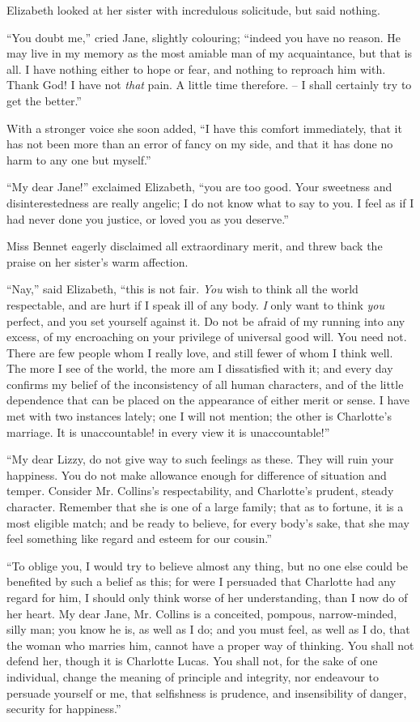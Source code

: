 Elizabeth looked at her sister with incredulous solicitude,
but said nothing.

“You doubt me,” cried Jane, slightly colouring;
“indeed you have no reason. He may live in my memory
as the most amiable man of my acquaintance, but that
is all. I have nothing either to hope or fear, and nothing
to reproach him with. Thank God! I have not \textit{that}
pain. A little time therefore. -- I shall certainly try to
get the better.”

With a stronger voice she soon added, “I have this
comfort immediately, that it has not been more than an
error of fancy on my side, and that it has done no harm
to any one but myself.”

“My dear Jane!” exclaimed Elizabeth, “you are too
good. Your sweetness and disinterestedness are really
angelic; I do not know what to say to you. I feel as if
I had never done you justice, or loved you as you
deserve.”

Miss Bennet eagerly disclaimed all extraordinary merit,
and threw back the praise on her sister’s warm affection.

“Nay,” said Elizabeth, “this is not fair. \textit{You} wish to
think all the world respectable, and are hurt if I speak ill
of any body. \textit{I} only want to think \textit{you} perfect, and you
set yourself against it. Do not be afraid of my running
into any excess, of my encroaching on your privilege of
universal good will. You need not. There are few people
whom I really love, and still fewer of whom I think well.
The more I see of the world, the more am I dissatisfied
with it; and every day confirms my belief of the inconsistency
of all human characters, and of the little dependence
that can be placed on the appearance of either merit
or sense. I have met with two instances lately; one
I will not mention; the other is Charlotte’s marriage.
It is unaccountable! in every view it is unaccountable!”

“My dear Lizzy, do not give way to such feelings as
these. They will ruin your happiness. You do not make
allowance enough for difference of situation and temper.
Consider Mr. Collins’s respectability, and Charlotte’s
prudent, steady character. Remember that she is one of
a large family; that as to fortune, it is a most eligible
match; and be ready to believe, for every body’s sake,
that she may feel something like regard and esteem for
our cousin.”

“To oblige you, I would try to believe almost any
thing, but no one else could be benefited by such a belief
as this; for were I persuaded that Charlotte had any
regard for him, I should only think worse of her understanding,
than I now do of her heart. My dear Jane,
Mr. Collins is a conceited, pompous, narrow-minded, silly
man; you know he is, as well as I do; and you must
feel, as well as I do, that the woman who marries him,
cannot have a proper way of thinking. You shall not
defend her, though it is Charlotte Lucas. You shall
not, for the sake of one individual, change the meaning
of principle and integrity, nor endeavour to persuade
yourself or me, that selfishness is prudence, and insensibility
of danger, security for happiness.”

